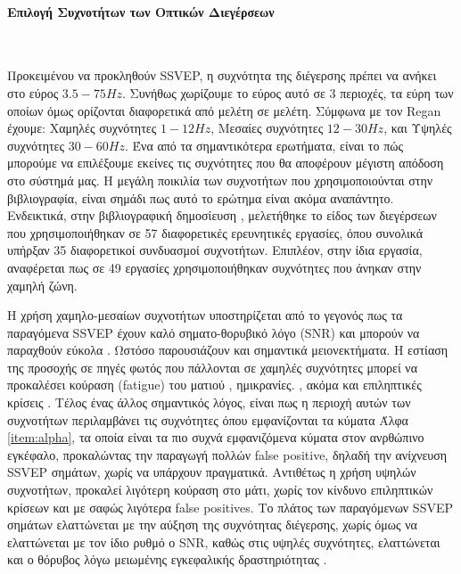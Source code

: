 \documentclass[11pt,a4paper,english,greek,twoside]{../Thesis}
\begin{document}
    \paragraph{Επιλογή Συχνοτήτων των Οπτικών Διεγέρσεων} ~\\
      \label{par:freq_choose}
      \par Προκειμένου να προκληθούν SSVEP, η συχνότητα της διέγερσης πρέπει να ανήκει στο εύρος $3.5 - 75Hz$. Συνήθως χωρίζουμε το εύρος αυτό σε 3 περιοχές, τα εύρη των οποίων όμως ορίζονται διαφορετικά από μελέτη σε μελέτη. Σύμφωνα με τον Regan \cite{regan1989human} έχουμε: Χαμηλές συχνότητες $1 - 12Hz$, Μεσαίες συχνότητες $12 - 30Hz$, και Υψηλές συχνότητες $30 - 60Hz$. Ένα από τα σημαντικότερα ερωτήματα, είναι το πώς μπορούμε να επιλέξουμε εκείνες τις συχνότητες που θα αποφέρουν μέγιστη απόδοση στο σύστημά μας. Η μεγάλη ποικιλία των συχνοτήτων που χρησιμοποιούνται στην βιβλιογραφία, είναι σημάδι πως αυτό το ερώτημα είναι ακόμα αναπάντητο. Ενδεικτικά, στην βιβλιογραφική δημοσίευση \cite{zhu2010survey}, μελετήθηκε το είδος των διεγέρσεων που χρησιμοποιήθηκαν σε 57 διαφορετικές ερευνητικές εργασίες, όπου συνολικά υπήρξαν 35 διαφορετικοί συνδυασμοί συχνοτήτων. Επιπλέον, στην ίδια εργασία, αναφέρεται πως σε 49 εργασίες χρησιμοποιήθηκαν συχνότητες που άνηκαν στην χαμηλή ζώνη. 
      \par Η χρήση χαμηλο-μεσαίων συχνοτήτων υποστηρίζεται από το γεγονός πως τα παραγόμενα SSVEP έχουν καλό σηματο-θορυβικό λόγο (SNR) και μπορούν να παραχθούν εύκολα \cite{yijun2005brain}. Ωστόσο παρουσιάζουν και σημαντικά μειονεκτήματα. Η εστίαση της προσοχής σε πηγές φωτός που πάλλονται σε χαμηλές συχνότητες μπορεί να προκαλέσει κούραση (fatigue) του ματιού \cite{lin2012snr}, ημικρανίες. \cite{detommaso1999steady}, ακόμα και επιληπτικές κρίσεις \cite{lin2012snr}. Τέλος ένας άλλος σημαντικός λόγος, είναι πως η περιοχή αυτών των συχνοτήτων περιλαμβάνει τις συχνότητες όπου εμφανίζονται τα κύματα Άλφα \ref{item:alpha}, τα οποία είναι τα πιο συχνά εμφανιζόμενα κύματα στον ανρθώπινο εγκέφαλο, προκαλώντας την παραγωγή πολλών false positive, δηλαδή την ανίχνευση SSVEP σημάτων, χωρίς να υπάρχουν πραγματικά. Αντιθέτως η χρήση υψηλών συχνοτήτων, προκαλεί λιγότερη κούραση στο μάτι, χωρίς τον κίνδυνο επιληπτικών κρίσεων και με σαφώς λιγότερα false positives. Το πλάτος των παραγόμενων SSVEP σημάτων ελαττώνεται με την αύξηση της συχνότητας διέγερσης, χωρίς όμως να ελαττώνεται με τον ίδιο ρυθμό ο SNR, καθώς στις υψηλές συχνότητες, ελαττώνεται και ο θόρυβος λόγω μειωμένης εγκεφαλικής δραστηριότητας \cite{wang2006practical}. 
      
\end{document}

